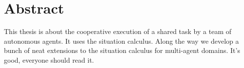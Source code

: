 
\chapter*{Abstract}

This thesis is about the cooperative execution of a shared task by
a team of autonomous agents.  It uses the situation calculus.  Along
the way we develop a bunch of neat extensions to the situation calculus
for multi-agent domains.  It's good, everyone should read it.


